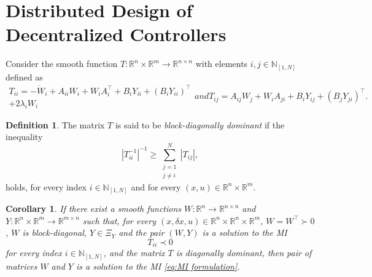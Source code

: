 \documentclass[10pt,twocolumn,twoside]{IEEEtran}
\theoremstyle{plain}
\newtheorem{corollary}[theorem]{Corollary}
\theoremstyle{definition}
\newtheorem{definition}[theorem]{Definition}
\theoremstyle{remark}
\begin{document}
\section{Distributed Design of Decentralized Controllers}

Consider the smooth function $T:\mathbb{R}^n\times\mathbb{R}^m\to\mathbb{R}^{n\times n}$ with elements $i,j\in\mathbb{N}_{[1,N]}$ defined as
	\begin{subequations}\label{eq:T}
	\begin{align}
		T_{ii}=-\dot{W}_i+A_{ii}W_i+W_iA_i^\top+B_iY_{ii}+(B_iY_{ii})^\top\nonumber\\
		+2\lambda_i W_i
	\end{align}
	and
	\begin{equation}
		T_{ij}=A_{ij}W_j+W_iA_{ji}+B_iY_{ij}+(B_jY_{ji})^\top.
	\end{equation}
	\end{subequations}


\begin{definition}\label{def:}
	The matrix $T$ is said to be \emph{block-diagonally dominant} if the inequality
	\begin{equation}\label{eq:BDD}
		|T_{ii}^{-1}|^{-1}\geq\sum_{\substack{j=1\\ j\neq i}}^N|T_{ij}|,
	\end{equation}
	holds, for every index $i\in\mathbb{N}_{[1,N]}$ and for every $(x,u)\in\mathbb{R}^n\times\mathbb{R}^m$.
\end{definition}

\begin{corollary}\label{cor:distributed computation}
	 If there exist a smooth functions $W:\mathbb{R}^n\to\mathbb{R}^{n\times n}$ and $Y:\mathbb{R}^n\times\mathbb{R}^m\to\mathbb{R}^{m\times n}$ such that, for every $(x,\delta x,u)\in\mathbb{R}^n\times\mathbb{R}^n\times\mathbb{R}^m$, $W=W^\top\succ0$, $W$ is block-diagonal, $Y\in\Xi_Y$ and the pair $(W,Y)$ is a solution to the MI
	\begin{equation}\label{eq:MI formulation:i}
		T_{ii}\prec 0
	\end{equation}
	for every index $i\in\mathbb{N}_{[1,N]}$, and the matrix $T$ is diagonally dominant, then pair of matrices $W$ and $Y$ is a solution to the MI \eqref{eq:MI formulation}.
\end{corollary}
\end{document}

